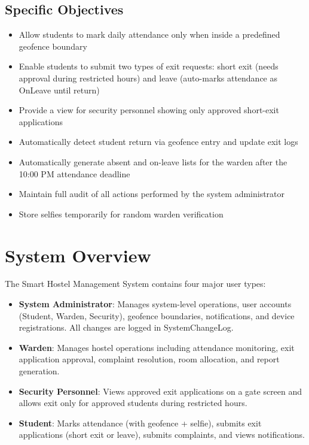 \documentclass[12pt,a4paper]{article}
\begin{document}
\subsection{Specific Objectives}
\begin{itemize}
    \item Allow students to mark daily attendance only when inside a predefined geofence boundary
    \item Enable students to submit two types of exit requests: short exit (needs approval during restricted hours) and leave (auto-marks attendance as OnLeave until return)
    \item Provide a view for security personnel showing only approved short-exit applications
    \item Automatically detect student return via geofence entry and update exit logs
    \item Automatically generate absent and on-leave lists for the warden after the 10:00 PM attendance deadline
    \item Maintain full audit of all actions performed by the system administrator
    \item Store selfies temporarily for random warden verification
\end{itemize}

\section{System Overview}

The Smart Hostel Management System contains four major user types:

\begin{itemize}
    \item \textbf{System Administrator}: Manages system-level operations, user accounts (Student, Warden, Security), geofence boundaries, notifications, and device registrations. All changes are logged in SystemChangeLog.
    \item \textbf{Warden}: Manages hostel operations including attendance monitoring, exit application approval, complaint resolution, room allocation, and report generation.
    \item \textbf{Security Personnel}: Views approved exit applications on a gate screen and allows exit only for approved students during restricted hours.
    \item \textbf{Student}: Marks attendance (with geofence + selfie), submits exit applications (short exit or leave), submits complaints, and views notifications.
\end{itemize}
\end{document}
